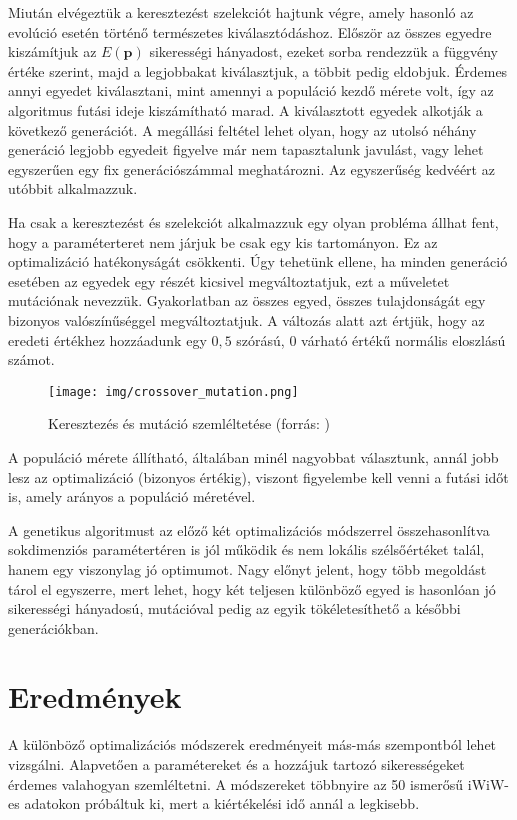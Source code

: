 \documentclass[12pt]{article}
\begin{document}
Miután elvégeztük a keresztezést szelekciót hajtunk végre, amely hasonló az evolúció esetén történő természetes kiválasztódáshoz. Először az összes egyedre kiszámítjuk az $E(\mathbf{p})$ sikerességi hányadost, ezeket sorba rendezzük a függvény értéke szerint, majd a legjobbakat kiválasztjuk, a többit pedig eldobjuk. Érdemes annyi egyedet kiválasztani, mint amennyi a populáció kezdő mérete volt, így az algoritmus futási ideje kiszámítható marad. A kiválasztott egyedek alkotják a következő generációt. A megállási feltétel lehet olyan, hogy az utolsó néhány generáció legjobb egyedeit figyelve már nem tapasztalunk javulást, vagy lehet egyszerűen egy fix generációszámmal meghatározni. Az egyszerűség kedvéért az utóbbit alkalmazzuk.

Ha csak a keresztezést és szelekciót alkalmazzuk egy olyan probléma állhat fent, hogy a paraméterteret nem járjuk be csak egy kis tartományon. Ez az optimalizáció hatékonyságát csökkenti. Úgy tehetünk ellene, ha minden generáció esetében az egyedek egy részét kicsivel megváltoztatjuk, ezt a műveletet mutációnak nevezzük. Gyakorlatban az összes egyed, összes tulajdonságát egy bizonyos valószínűséggel megváltoztatjuk. A változás alatt azt értjük, hogy az eredeti értékhez hozzáadunk egy $0,5$ szórású, $0$ várható értékű normális eloszlású számot. %

\begin{figure}[H]
	\centering
	\texttt{[image: img/crossover\_mutation.png]}
	\caption{Keresztezés és mutáció szemléltetése (forrás: \cite{genetic_cross-mutation})}
	\label{}
\end{figure}

A populáció mérete állítható, általában minél nagyobbat választunk, annál jobb lesz az optimalizáció (bizonyos értékig), viszont figyelembe kell venni a futási időt is, amely arányos a populáció méretével.

A genetikus algoritmust az előző két optimalizációs módszerrel összehasonlítva sokdimenziós paramétertéren is jól működik és nem lokális szélsőértéket talál, hanem egy viszonylag jó optimumot. Nagy előnyt jelent, hogy több megoldást tárol el egyszerre, mert lehet, hogy két teljesen különböző egyed is hasonlóan jó sikerességi hányadosú, mutációval pedig az egyik tökéletesíthető a későbbi generációkban.

\section{Eredmények}
A különböző optimalizációs módszerek eredményeit más-más szempontból lehet vizsgálni. Alapvetően a paramétereket és a hozzájuk tartozó sikerességeket érdemes valahogyan szemléltetni. A módszereket többnyire az 50 ismerősű iWiW-es adatokon próbáltuk ki, mert a kiértékelési idő annál a legkisebb.
\end{document}

